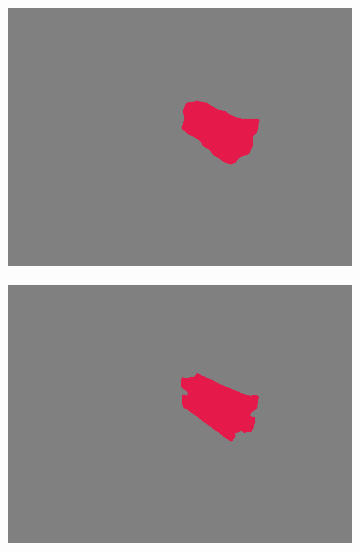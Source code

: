 \begin{figure}[h]
\begin{subfigure}{.24\textwidth}
			\includegraphics[width=1\linewidth]{images/sample_predictions/s40_40_G_013_mob_binary_pred}
		\end{subfigure}
		\begin{subfigure}{.24\textwidth}
			\centering
			\includegraphics[width=1\linewidth]{images/sample_predictions/s40_40_G_013_xcep_binary_pred}
		\end{subfigure}
		\begin{subfigure}{.24\textwidth}
			\centering

\end{subfigure}
\end{figure}
